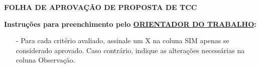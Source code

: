 \documentclass{ufsc-thesis} %
\begin{document}
\pretextual%
\imprimircapa

\imprimirfolhaderosto

\afterpage{\null\newpage}

\clearpage
\newpage


\begin{snugshade}

\begin{center}
{\textbf{\small{FOLHA DE APROVAÇÃO DE PROPOSTA DE TCC}}}

\end{center}

\end{snugshade}

\noindent{}

\vspace{8pt}

\noindent\textbf{Instruções para preenchimento pelo \uline{\small{ORIENTADOR DO TRABALHO}}:}
\begin{itemize}[leftmargin=*,noitemsep,topsep=0pt]
	\item[-] \small Para cada critério avaliado, assinale um X na coluna SIM apenas se considerado aprovado. Caso contrário, indique as alterações necessárias na coluna Observação.
\end{itemize}

\vspace{8pt}
\end{document}
